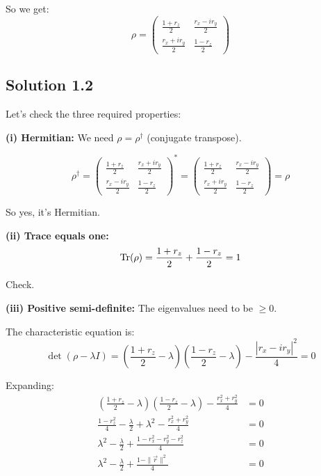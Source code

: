 \documentclass[11pt]{article}
\begin{document}
So we get:
\begin{equation*}
    \rho = \begin{pmatrix} \frac{1+r_z}{2} & \frac{r_x - ir_y}{2} \\ \frac{r_x + ir_y}{2} & \frac{1-r_z}{2} \end{pmatrix}
\end{equation*}

\subsection{Solution 1.2}

Let's check the three required properties:

\textbf{(i) Hermitian:} We need $\rho = \rho^\dagger$ (conjugate transpose).

\begin{equation*}
    \rho^\dagger = \begin{pmatrix} \frac{1+r_z}{2} & \frac{r_x + ir_y}{2} \\ \frac{r_x - ir_y}{2} & \frac{1-r_z}{2} \end{pmatrix}^* = \begin{pmatrix} \frac{1+r_z}{2} & \frac{r_x - ir_y}{2} \\ \frac{r_x + ir_y}{2} & \frac{1-r_z}{2} \end{pmatrix} = \rho
\end{equation*}

So yes, it's Hermitian.

\textbf{(ii) Trace equals one:}
\begin{equation*}
    \Tr(\rho) = \frac{1+r_z}{2} + \frac{1-r_z}{2} = 1
\end{equation*}

Check.

\textbf{(iii) Positive semi-definite:} The eigenvalues need to be $\geq 0$.

The characteristic equation is:
\begin{equation*}
    \det(\rho - \lambda I) = \left(\frac{1+r_z}{2} - \lambda\right)\left(\frac{1-r_z}{2} - \lambda\right) - \frac{|r_x - ir_y|^2}{4} = 0
\end{equation*}

Expanding:
\begin{align*}
    \left(\frac{1+r_z}{2} - \lambda\right)\left(\frac{1-r_z}{2} - \lambda\right) - \frac{r_x^2 + r_y^2}{4} &= 0 \\
    \frac{1-r_z^2}{4} - \frac{\lambda}{2} + \lambda^2 - \frac{r_x^2 + r_y^2}{4} &= 0 \\
    \lambda^2 - \frac{\lambda}{2} + \frac{1 - r_x^2 - r_y^2 - r_z^2}{4} &= 0 \\
    \lambda^2 - \frac{\lambda}{2} + \frac{1 - \|\vec{r}\|^2}{4} &= 0
\end{align*}
\end{document}
